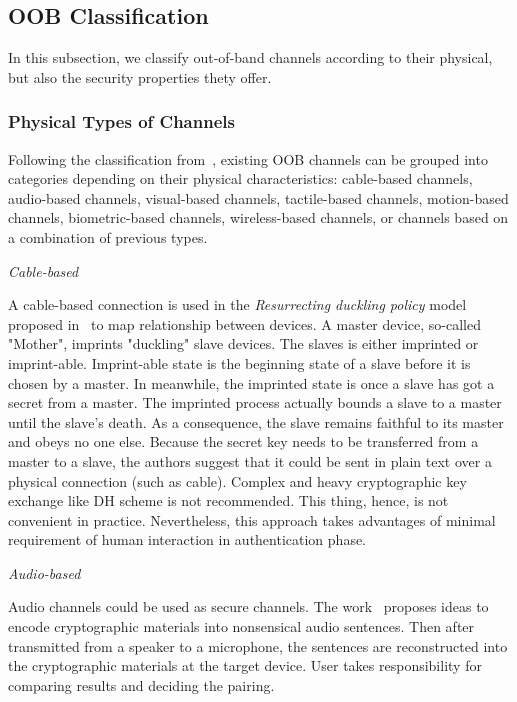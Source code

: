 \subsection{OOB Classification}

In this subsection, we classify out-of-band channels according to their physical, but also the security properties thety offer. 

\subsubsection{Physical Types of Channels}

Following the classification from~\cite{KhanPathanbook}, existing OOB channels can be grouped into categories depending on their  physical characteristics: cable-based channels, audio-based channels, visual-based channels, tactile-based channels, motion-based channels, biometric-based channels, wireless-based channels, or channels based on a combination of previous types.

\emph{Cable-based}

A cable-based connection is used in the \textit{Resurrecting duckling policy} model proposed in~\cite{Stajano:2000bs} to map relationship between devices. A master device, so-called "Mother", imprints "duckling" slave devices. The slaves is either imprinted or imprint-able. Imprint-able state is the beginning state of a slave before it is chosen by a master. In meanwhile, the imprinted state is once a slave has got a secret from a master. The imprinted process actually bounds a slave to a master until the slave's death. As a consequence, the slave remains faithful to its master and obeys no one else. Because the secret key needs to be transferred from a master to a slave, the authors suggest that it could be sent in plain text over a physical connection (such as cable). Complex and heavy cryptographic key exchange like DH scheme is not recommended. This thing, hence, is not convenient in practice. Nevertheless, this approach takes advantages of minimal requirement of human interaction in authentication phase. 

\emph{Audio-based}

Audio channels could be used as secure channels. The work~\cite{1648797, Soriente:2008, Lin:2011, Saxena:2008:UDP:1408664.1408672, 5678019, Sigg:2012aa} proposes ideas to encode cryptographic materials into nonsensical audio sentences. Then after transmitted from a speaker to a microphone, the sentences are reconstructed into the cryptographic materials at the target device. User takes responsibility for comparing results and deciding the pairing. 

